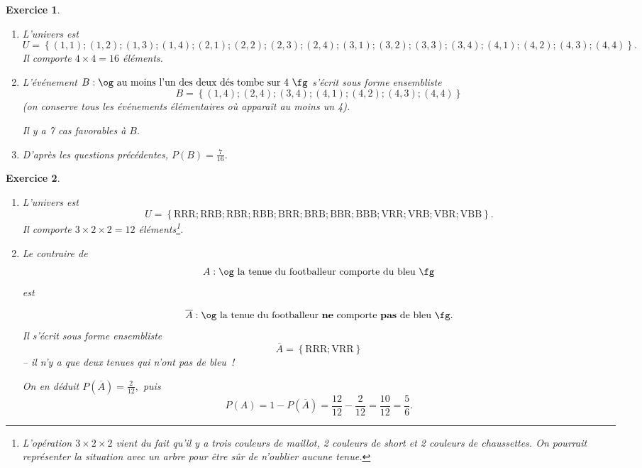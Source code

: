 \documentclass[10pt]{article}
\newtheorem{exo}{Exercice}
\begin{document}
\begin{exo}





\begin{enumerate}
\item L’univers est \[
U=\left\{(1,1);(1,2);(1,3);(1,4);(2,1);(2,2);(2,3);(2,4);(3,1);(3,2);(3,3);(3,4);(4,1);(4,2);(4,3);(4,4)\right\}.\] Il comporte $4\times 4=16$ éléments.
\item L’événement $B : \text{\og au moins l'un des deux dés tombe sur 4 \fg}$ s'écrit sous forme ensembliste
\[
B=\left\{(1,4);(2,4);(3,4);(4,1);(4,2);(4,3);(4,4)\right\}\] (on conserve tous les événements élémentaires où apparaît au moins un 4).

Il y a 7 cas favorables à $B.$
\item D'après les questions précédentes, $P(B)=\frac{7}{16}.$
\end{enumerate}

\end{exo}




 \begin{exo}


\begin{enumerate}
\item L’univers est \[
U=\left\{\text{RRR};\text{RRB};\text{RBR};\text{RBB};\text{BRR};\text{BRB};\text{BBR};\text{BBB};\text{VRR};\text{VRB};\text{VBR};\text{VBB}\right\}.\] Il comporte $3\times 2\times 2=12$ éléments\footnote{L'opération  $3\times 2\times 2$ vient du fait qu'il y a trois couleurs de maillot, 2 couleurs de short et 2 couleurs de chaussettes. On pourrait représenter la situation avec un arbre pour être sûr de n'oublier aucune tenue.}.
\item Le contraire de  \[A : \text{\og la tenue du footballeur comporte du bleu \fg}\] est

\[\overline{A} : \text{\og la tenue du footballeur \textbf{ne} comporte \textbf{pas} de bleu \fg}.\] Il s'écrit sous forme ensembliste
\[\overline{A}=\left\{\text{RRR};\text{VRR}\right\}\] -- il n'y a que deux tenues qui n'ont pas de bleu~!

\medskip

On en déduit $P\left(\overline{A}\right)=\frac{2}{12},$ puis \[P(A)=1-P\left(\overline{A}\right)=\frac{12}{12}-\frac{2}{12}=\frac{10}{12}=\frac{5}{6}.\]

\end{enumerate}

\end{exo}
\end{document}
